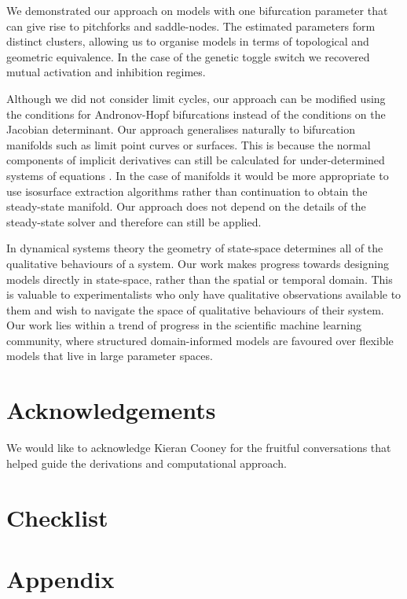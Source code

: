 We demonstrated our approach on models with one bifurcation parameter that can give rise to pitchforks and saddle-nodes. The estimated parameters form distinct clusters, allowing us to organise models in terms of topological and geometric equivalence. In the case of the genetic toggle switch we recovered mutual activation and inhibition regimes.

Although we did not consider limit cycles, our approach can be modified using the conditions for Andronov-Hopf bifurcations instead of the conditions on the Jacobian determinant. Our approach generalises naturally to bifurcation manifolds such as limit point curves or surfaces. This is because the normal components of implicit derivatives can still be calculated for under-determined systems of equations \cite{Jos2011OnSurface,Tao2016Near-IsometricTracking,Fujisawa2013CalculationInvariance}. In the case of manifolds it would be more appropriate to use isosurface extraction algorithms rather than continuation to obtain the steady-state manifold. Our approach does not depend on the details of the steady-state solver and therefore can still be applied.

In dynamical systems theory the geometry of state-space determines all of the qualitative behaviours of a system. Our work makes progress towards designing models directly in state-space, rather than the spatial or temporal domain. This is valuable to experimentalists who only have qualitative observations available to them and wish to navigate the space of qualitative behaviours of their system. Our work lies within a trend of progress in the scientific machine learning community, where structured domain-informed models are favoured over flexible models that live in large parameter spaces.

\section{Acknowledgements}
We would like to acknowledge Kieran Cooney for the fruitful conversations that helped guide the derivations and computational approach.




\clearpage{}
\section*{Checklist}


\clearpage{}\setcounter{page}{1}
\section*{Appendix}
\appendix


